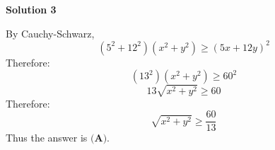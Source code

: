 \begin{enumerate}
 



\textbf{Solution 3}

By Cauchy-Schwarz, 
 \[(5^2 + 12^2)(x^2 + y^2) \geq (5x+12y)^2\]Therefore: 
 \[(13^2)(x^2 + y^2) \geq 60^2\]
 \[13\sqrt{x^2 + y^2} \geq 60\]Therefore:
 \[\sqrt{x^2 + y^2} \geq \frac{60}{13}\]Thus the answer is $\boxed{\textbf{(A)}}$.

 


\end{enumerate}